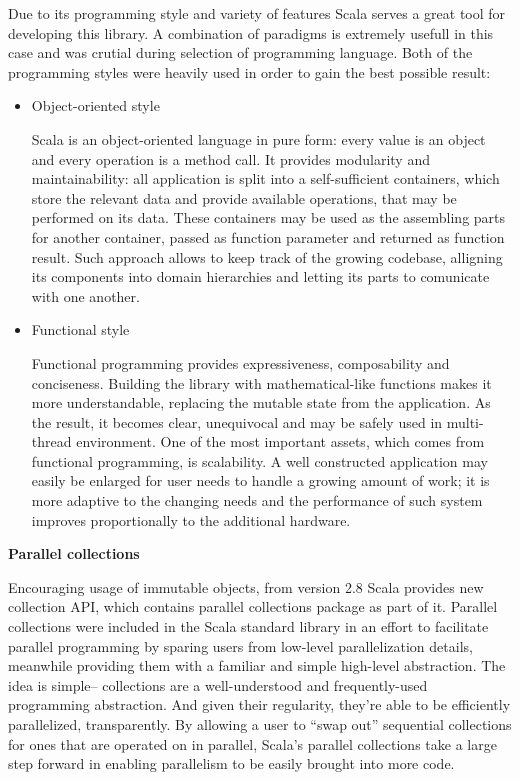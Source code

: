 
Due to its programming style and variety of features Scala serves a great tool for developing this library. A combination of paradigms is extremely usefull in this case and was crutial during selection of programming language. Both of the programming styles were heavily used in order to gain the best possible result:
\begin{itemize}
\item
Object-oriented style

Scala is an object-oriented language in pure form: every value is an object and every operation is a method call. \cite{programming_in_scala} It provides modularity and maintainability: all application is split into a self-sufficient containers, which store the relevant data and provide available operations, that may be performed on its data. These containers may be used as the assembling parts for another container, passed as function parameter and returned as function result. Such approach allows to keep track of the growing codebase, alligning its components into domain hierarchies and letting its parts to comunicate with one another.

\item
Functional style

Functional programming provides expressiveness, composability and conciseness. Building the library with mathematical-like functions makes it more understandable, replacing the mutable state from the application. As the result, it becomes clear, unequivocal and may be safely used in multi-thread environment. One of the most important assets, which comes from functional programming, is scalability. A well constructed application may easily be enlarged for user needs to handle a growing amount of work; it is more adaptive to the changing needs and the performance of such system improves proportionally to the additional hardware.

\end{itemize} 

 \textbf{Parallel collections}

 Encouraging usage of immutable objects, from version 2.8 Scala provides new collection API, which contains parallel collections package as part of it. Parallel collections were included in the Scala standard library in an effort to facilitate parallel programming by sparing users from low-level parallelization details, meanwhile providing them with a familiar and simple high-level abstraction. The idea is simple– collections are a well-understood and frequently-used programming abstraction. And given their regularity, they’re able to be efficiently parallelized, transparently. By allowing a user to “swap out” sequential collections for ones that are operated on in parallel, Scala’s parallel collections take a large step forward in enabling parallelism to be easily brought into more code. \cite{scala_parallel_collections_overview}

